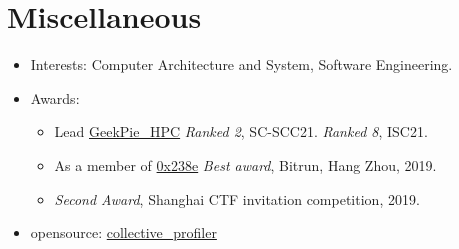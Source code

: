 \documentclass{resume}
\newcommand{\en}[1]{#1}
\newcommand{\zh}[1]{}
\begin{document}
\section{\en{Miscellaneous}\zh{其他}}
\begin{itemize}
      \item \en{Interests: Computer Architecture and System, Software Engineering.}
            \zh{兴趣：高性能计算、存储、形式化验证安全等。}
      \item \en{Awards:}
      \zh{所获奖项：}
      \begin{itemize}
      \item \en{Lead \href{https://hpc.geekpie.club}{GeekPie\_HPC} \textit{Ranked 2}, SC-SCC21. \textit{Ranked 8}, ISC21.}
            \zh{带领\href{https://hpc.geekpie.club}{GeekPie\_HPC} SCC20 团队第9名，SCC21 团队第2名，ISC21 团队第8名}
      \item \en{As a member of \href{https://github.com/0x238e/Vchain}{0x238e} \textit{Best award}, Bitrun, Hang Zhou, 2019.}
            \zh{带领\href{https://github.com/0x238e/Vchain}{0x238e} Bitrun Hackathon 比赛最佳奖}
      \item \en{\textit{Second Award}, Shanghai CTF invitation competition, 2019.}
            \zh{上海2019年 CTF 邀请赛比赛二等奖}
      \end{itemize}
      \item \en{opensource: \href{https://github.com/geekpiehpc/collective_profiler}{collective\_profiler}}
      \zh{开源项目贡献：\href{https://github.com/geekpiehpc/collective_profiler}{collective\_profiler} }
\end{itemize}
\end{document}
